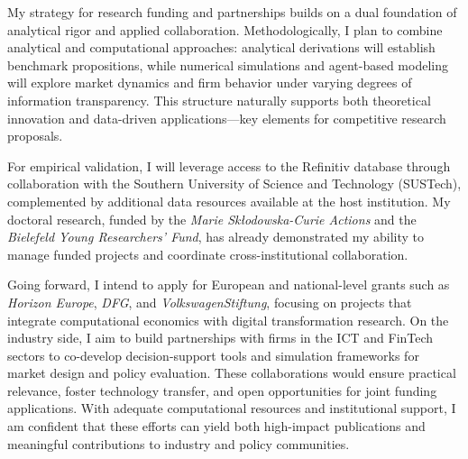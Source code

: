 \documentclass{nfr}
\begin{document}
My strategy for research funding and partnerships builds on a dual foundation of analytical rigor and applied collaboration. 
Methodologically, I plan to combine analytical and computational approaches: analytical derivations will establish benchmark propositions, while numerical simulations and agent-based modeling will explore market dynamics and firm behavior under varying degrees of information transparency. This structure naturally supports both theoretical innovation and data-driven applications—key elements for competitive research proposals.

For empirical validation, I will leverage access to the Refinitiv database through collaboration with the Southern University of Science and Technology (SUSTech), complemented by additional data resources available at the host institution. My doctoral research, funded by the \textit{Marie Skłodowska-Curie Actions} and the \textit{Bielefeld Young Researchers’ Fund}, has already demonstrated my ability to manage funded projects and coordinate cross-institutional collaboration. 

Going forward, I intend to apply for European and national-level grants such as \textit{Horizon Europe}, \textit{DFG}, and \textit{VolkswagenStiftung}, focusing on projects that integrate computational economics with digital transformation research. On the industry side, I aim to build partnerships with firms in the ICT and FinTech sectors to co-develop decision-support tools and simulation frameworks for market design and policy evaluation. These collaborations would ensure practical relevance, foster technology transfer, and open opportunities for joint funding applications. With adequate computational resources and institutional support, I am confident that these efforts can yield both high-impact publications and meaningful contributions to industry and policy communities.
\end{document}

